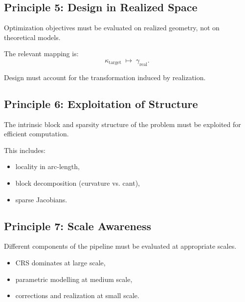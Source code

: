 \subsection{Principle 5: Design in Realized Space}

\begin{proposition}
Optimization objectives must be evaluated on realized geometry, not on
theoretical models.
\end{proposition}

The relevant mapping is:
\[
\kappa_{\mathrm{target}}
\;\mapsto\;
\gamma_{\mathrm{real}}.
\]

Design must account for the transformation induced by realization.


\subsection{Principle 6: Exploitation of Structure}

\begin{proposition}
The intrinsic block and sparsity structure of the problem must be
exploited for efficient computation.
\end{proposition}

This includes:
\begin{itemize}
\item locality in arc-length,
\item block decomposition (curvature vs. cant),
\item sparse Jacobians.
\end{itemize}


\subsection{Principle 7: Scale Awareness}

\begin{proposition}
Different components of the pipeline must be evaluated at appropriate
scales.
\end{proposition}

\begin{itemize}
\item CRS dominates at large scale,
\item parametric modelling at medium scale,
\item corrections and realization at small scale.
\end{itemize}


